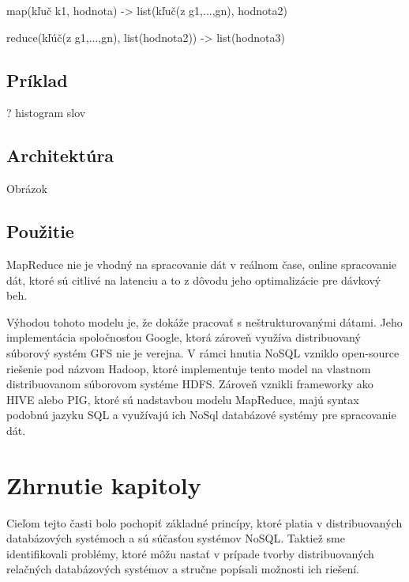 \documentclass[11pt,twoside,a4paper]{book}
\begin{document}
map(kľuč k1, hodnota) -> list(kľuč(z g1,...,gn), hodnota2)

reduce(kľúč(z g1,...,gn), list(hodnota2)) -> list(hodnota3)

\subsection{Príklad}
? histogram slov

\subsection{Architektúra}
Obrázok

\subsection{Použitie}

MapReduce nie je vhodný na spracovanie dát v reálnom čase, online spracovanie dát, ktoré sú citlivé na latenciu a to z dôvodu jeho optimalizácie pre dávkový beh.

Výhodou tohoto modelu je, že dokáže pracovať s neštrukturovanými dátami. Jeho implementácia spoločnosťou Google, ktorá zároveň využíva distribuovaný súborový systém GFS nie je verejna. V rámci hnutia NoSQL vzniklo open-source riešenie pod názvom Hadoop, ktoré implementuje tento model na vlastnom distribuovanom súborovom systéme HDFS. Zároveň vznikli frameworky ako HIVE alebo PIG, ktoré sú nadstavbou modelu MapReduce, majú syntax podobnú  jazyku SQL a využívajú ich NoSql databázové systémy pre spracovanie dát. 


\section{Zhrnutie kapitoly}
Cieľom tejto časti bolo pochopiť základné princípy, ktoré platia v distribuovaných databázových systémoch a sú súčasťou systémov NoSQL. Taktiež sme identifikovali problémy, ktoré môžu nastať v prípade tvorby distribuovaných relačných databázových systémov a stručne popísali možnosti ich riešení.


% 

% 
\end{document}
